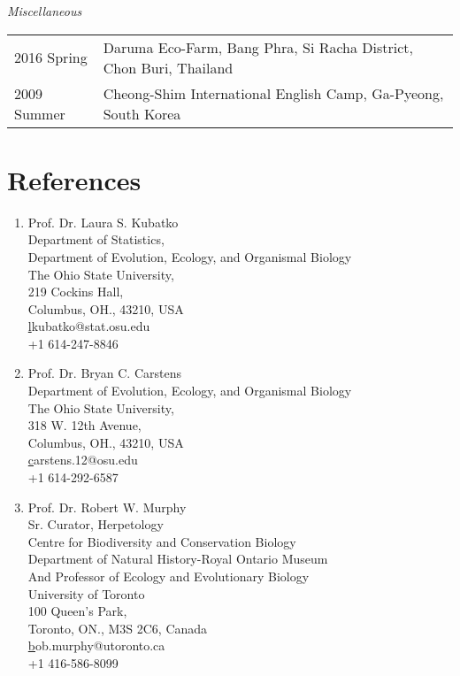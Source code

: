 \documentclass[11pt]{article}
\begin{document}
\textit{Miscellaneous}\\
\begin{longtable}{p{}  p{}}
2016 Spring & Daruma Eco-Farm, Bang Phra, Si Racha District, Chon Buri, Thailand\\
2009 Summer & Cheong-Shim International English Camp, Ga-Pyeong, South Korea\\
\end{longtable}

\hspace{0pt}


\section*{References}

\begin{enumerate}

\item Prof. Dr. Laura S. Kubatko\\
Department of Statistics,\\
Department of Evolution, Ecology, and Organismal Biology\\
The Ohio State University,\\
219 Cockins Hall,\\
Columbus, OH., 43210, USA\\
\href{lkubatko@stat.osu.edu}lkubatko@stat.osu.edu\\
+1 614-247-8846\\

\item Prof. Dr. Bryan C. Carstens\\
Department of Evolution, Ecology, and Organismal Biology\\
The Ohio State University,\\
318 W. 12th Avenue,\\
Columbus, OH., 43210, USA\\
\href{carstens.12@osu.edu}carstens.12@osu.edu\\
+1 614-292-6587\\

\item Prof. Dr. Robert W. Murphy\\
Sr. Curator, Herpetology\\
Centre for Biodiversity and Conservation Biology\\
Department of Natural History-Royal Ontario Museum\\
And Professor of Ecology and Evolutionary Biology\\ 
University of Toronto\\
100 Queen’s Park,\\
Toronto, ON., M3S 2C6, Canada\\
\href{bob.murphy@utoronto.ca}bob.murphy@utoronto.ca\\
+1 416-586-8099


\end{enumerate}
\end{document}
